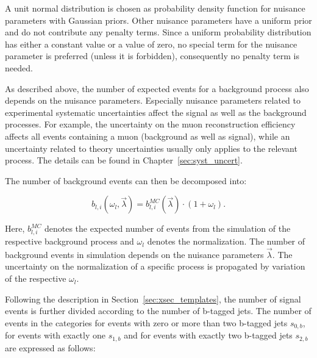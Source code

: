 A unit normal distribution is chosen as probability density function for nuisance parameters with Gaussian priors. Other nuisance parameters have a uniform prior and do not contribute any penalty terms. 
Since a uniform probability distribution has either a constant value or a value of zero, no special term for the nuisance parameter is preferred (unless it is forbidden), consequently no penalty term is needed. 

As described above, the number of expected events for a background process also depends on the nuisance parameters. Especially nuisance parameters related to experimental systematic uncertainties affect the signal as well as the background processes. For example, the uncertainty on the muon reconstruction efficiency affects all events containing a muon (background as well as signal), while an uncertainty related to theory uncertainties usually only applies to the relevant process. The details can be found in Chapter~\ref{sec:syst_uncert}.

The number of background events can then be decomposed into:

\begin{equation}
b_{l,i}(\omega_l,\vec{\lambda}) = b_{l,i}^{MC}(\vec{\lambda}) \cdot (1 + \omega_l).
\label{eq:nbli}
\end{equation}

Here, $b_{l,i}^{MC}$ denotes the expected number of events from the simulation of the respective background process and $\omega_l$ denotes the normalization. The number of background events in simulation depends on the nuisance parameters $\vec{\lambda}$. The uncertainty on the normalization of a specific process is propagated
by variation of the respective $\omega_l$.

Following the description in Section~\ref{sec:xsec_templates},  the number of signal events is further divided according to the number of b-tagged jets.
The number of events in the categories for events with zero or more than two b-tagged jets $s_{0,b}$, for events with exactly one $s_{1,b}$ and for events with exactly two b-tagged jets $s_{2,b}$ are expressed as follows:

